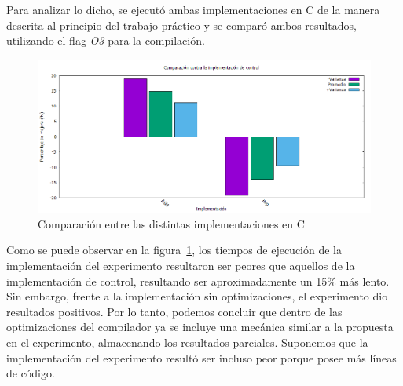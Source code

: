 \documentclass[a4paper]{article}
\begin{document}
Para analizar lo dicho, se ejecutó ambas implementaciones en C de la manera descrita al principio del trabajo práctico y se comparó ambos resultados, utilizando el flag \textit{O3} para la compilación.
\\
\begin{figure}[H]
  \begin{center}
	\includegraphics[scale=0.6]{imagenes/colorizarExp.png}
	\caption{Comparación entre las distintas implementaciones en C}
	\label{colorizar_exp}
  \end{center}
\end{figure}

Como se puede observar en la figura~\ref{colorizar_exp}, los tiempos de ejecución de la implementación del experimento resultaron ser peores que aquellos de la implementación de control, resultando ser aproximadamente un 15\% más lento. Sin embargo, frente a la implementación sin optimizaciones, el experimento dio resultados positivos. Por lo tanto, podemos concluir que dentro de las optimizaciones del compilador ya se incluye una mecánica similar a la propuesta en el experimento, almacenando los resultados parciales. Suponemos que la implementación del experimento resultó ser incluso peor porque posee más líneas de código.
\end{document}
